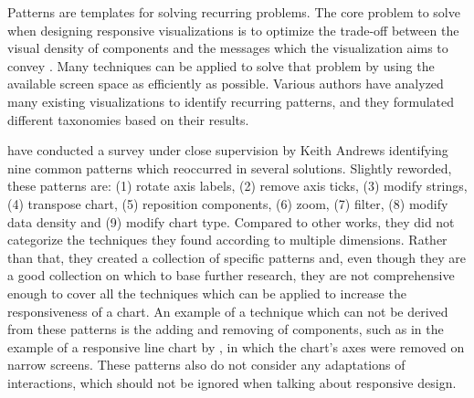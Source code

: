 Patterns are templates for solving recurring problems.  The core
problem to solve when designing responsive visualizations is to
optimize the trade-off between the visual density of components and
the messages which the visualization aims to convey
\parencite{DesignPatternsTradeOffsRespVis}.  Many techniques can be
applied to solve that problem by using the available screen space as
efficiently as possible.  Various authors have analyzed many existing
visualizations to identify recurring patterns, and they formulated
different taxonomies based on their results.

\textcite{RespVisSurvey} have conducted a survey under close
supervision by Keith Andrews \parencite{RespVis} identifying nine
common patterns which reoccurred in several solutions.  Slightly
reworded, these patterns are: (1) rotate axis labels, (2) remove axis
ticks, (3) modify strings, (4) transpose chart, (5) reposition
components, (6) zoom, (7) filter, (8) modify data density and (9)
modify chart type.  Compared to other works, they did not categorize
the techniques they found according to multiple dimensions.  Rather
than that, they created a collection of specific patterns and, even
though they are a good collection on which to base further research,
they are not comprehensive enough to cover all the techniques which
can be applied to increase the responsiveness of a chart.  An example
of a technique which can not be derived from these patterns is the
adding and removing of components, such as in the example of a
responsive line chart by \textcite{RespVis}, in which the chart's axes
were removed on narrow screens.  These patterns also do not consider
any adaptations of interactions, which should not be ignored when
talking about responsive design.

